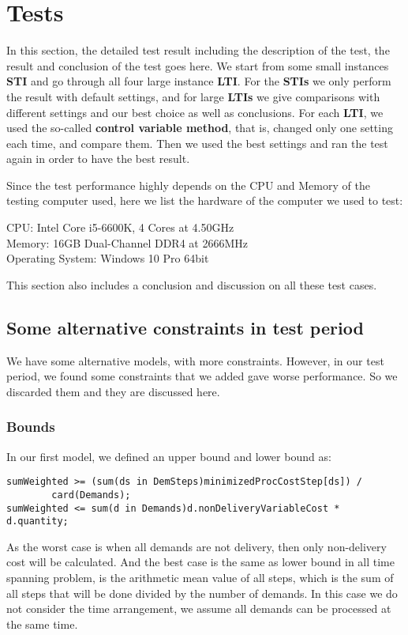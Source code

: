 \documentclass[a4paper, 12pt]{article}
\begin{document}
\section{Tests}

In this section, the detailed test result including the description of the test, the result and conclusion of the test goes here. We start from some small instances \textbf{STI} and go through all four large instance \textbf{LTI}. For the \textbf{STIs} we only perform the result with default settings, and for large \textbf{LTIs} we give comparisons with different settings and our best choice as well as conclusions. For each \textbf{LTI}, we used the so-called \textbf{control variable method}, that is, changed only one setting each time, and compare them. Then we used the best settings and ran the test again in order to have the best result. 

Since the test performance highly depends on the CPU and Memory of the testing computer used, here we list the hardware of the computer we used to test: 

CPU: Intel Core i5-6600K, 4 Cores at 4.50GHz \\
Memory: 16GB Dual-Channel DDR4 at 2666MHz\\
Operating System: Windows 10 Pro 64bit

This section also includes a conclusion and discussion on all these test cases. 

\subsection{Some alternative constraints in test period}

We have some alternative models, with more constraints. However, in our test period, we found some constraints that we added gave worse performance. So we discarded them and they are discussed here. 

\subsubsection{Bounds}
In our first model, we defined an upper bound and lower bound as: 
\begin{lstlisting}
sumWeighted >= (sum(ds in DemSteps)minimizedProcCostStep[ds]) / 
        card(Demands);
sumWeighted <= sum(d in Demands)d.nonDeliveryVariableCost * 
d.quantity; 
\end{lstlisting}
As the worst case is when all demands are not delivery, then only non-delivery cost will be calculated. And the best case is the same as lower bound in all time spanning problem, is the arithmetic mean value of all steps, which is the sum of all steps that will be done divided by the number of demands. In this case we do not consider the time arrangement, we assume all demands can be processed at the same time.
\end{document}
